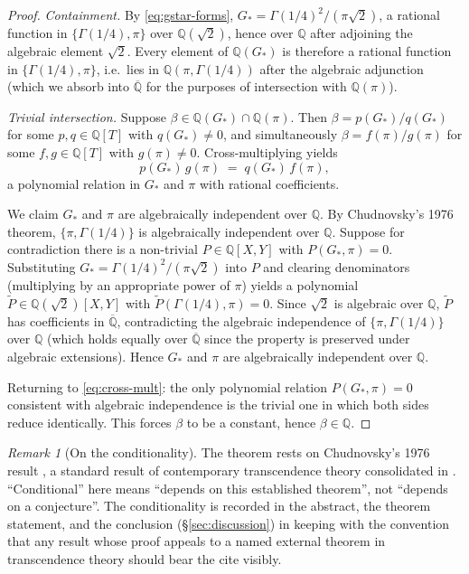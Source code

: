 \documentclass[11pt,reqno]{amsart}
\theoremstyle{plain}
\theoremstyle{definition}
\theoremstyle{remark}
\newtheorem{remark}[theorem]{Remark}
\numberwithin{equation}{section}
\newcommand{\Gstar}{G_{\!*}}
\begin{document}
\begin{proof}
\emph{Containment.} By \eqref{eq:gstar-forms},
$\Gstar = \Gamma(1/4)^{2}/(\pi\sqrt{2})$, a rational function in
$\{\Gamma(1/4), \pi\}$ over $\mathbb{Q}(\sqrt{2})$, hence over
$\mathbb{Q}$ after adjoining the algebraic element $\sqrt{2}$. Every
element of $\mathbb{Q}(\Gstar)$ is therefore a rational function in
$\{\Gamma(1/4), \pi\}$, i.e.\ lies in $\mathbb{Q}(\pi, \Gamma(1/4))$
after the algebraic adjunction (which we absorb into
$\overline{\mathbb{Q}}$ for the purposes of intersection with
$\mathbb{Q}(\pi)$).

\emph{Trivial intersection.} Suppose $\beta \in \mathbb{Q}(\Gstar) \cap
\mathbb{Q}(\pi)$. Then $\beta = p(\Gstar)/q(\Gstar)$ for some
$p, q \in \mathbb{Q}[T]$ with $q(\Gstar) \neq 0$, and simultaneously
$\beta = f(\pi)/g(\pi)$ for some $f, g \in \mathbb{Q}[T]$ with
$g(\pi) \neq 0$. Cross-multiplying yields
\begin{equation}
\label{eq:cross-mult}
  p(\Gstar)\,g(\pi) \;=\; q(\Gstar)\,f(\pi),
\end{equation}
a polynomial relation in $\Gstar$ and $\pi$ with rational coefficients.

We claim $\Gstar$ and $\pi$ are algebraically independent over
$\mathbb{Q}$. By Chudnovsky's 1976 theorem,
$\{\pi, \Gamma(1/4)\}$ is algebraically independent over $\mathbb{Q}$.
Suppose for contradiction there is a non-trivial
$P \in \mathbb{Q}[X, Y]$ with $P(\Gstar, \pi) = 0$. Substituting
$\Gstar = \Gamma(1/4)^{2}/(\pi\sqrt{2})$ into $P$ and clearing
denominators (multiplying by an appropriate power of $\pi$) yields a
polynomial $\widetilde{P} \in \mathbb{Q}(\sqrt{2})[X, Y]$ with
$\widetilde{P}(\Gamma(1/4), \pi) = 0$. Since $\sqrt{2}$ is algebraic
over $\mathbb{Q}$, $\widetilde{P}$ has coefficients in
$\overline{\mathbb{Q}}$, contradicting the algebraic independence of
$\{\pi, \Gamma(1/4)\}$ over $\mathbb{Q}$ (which holds equally over
$\overline{\mathbb{Q}}$ since the property is preserved under
algebraic extensions). Hence $\Gstar$ and $\pi$ are algebraically
independent over $\mathbb{Q}$.

Returning to \eqref{eq:cross-mult}: the only polynomial relation
$P(\Gstar, \pi) = 0$ consistent with algebraic independence is the
trivial one in which both sides reduce identically. This forces
$\beta$ to be a constant, hence $\beta \in \mathbb{Q}$. \qedhere
\end{proof}

\begin{remark}[On the conditionality]
The theorem rests on Chudnovsky's 1976 result \cite{chudnovsky1976}, a
standard result of contemporary transcendence theory consolidated in
\cite[\S 1.4]{waldschmidt2000}. ``Conditional'' here means
``depends on this established theorem'', not ``depends on a
conjecture''. The conditionality is recorded in the abstract, the
theorem statement, and the conclusion (\S\ref{sec:discussion}) in
keeping with the convention that any result whose proof appeals to a
named external theorem in transcendence theory should bear the cite
visibly.
\end{remark}
\end{document}
